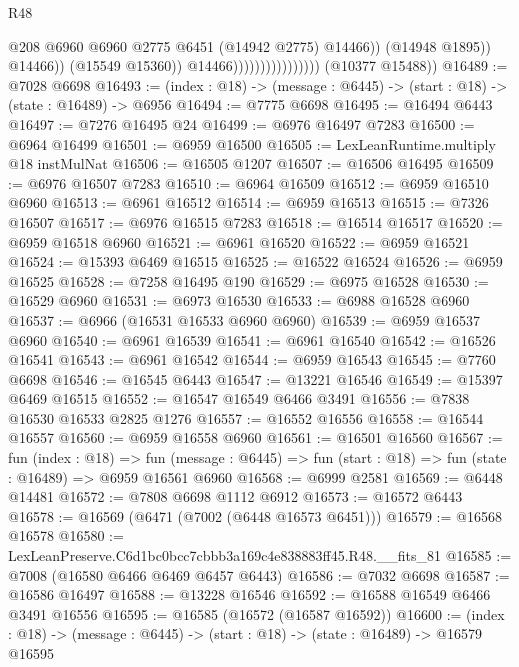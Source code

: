 \begin{lexlean}{R48}
\begin{coremodule}
                                                  @208
                                                  @6960
                                                  @6960
                                                  @2775
                                                  @6451
                                                  (@14942 @2775)
                                                  @14466))
                                              (@14948 @1895))
                                            @14466))
                                        (@15549 @15360))
                                      @14466))))))))))))))))
      (@10377 @15488))
@16489 := @7028 @6698
@16493 := (index : @18) -> (message : @6445) -> (start : @18) -> (state : @16489) -> @6956
@16494 := @7775 @6698
@16495 := @16494 @6443
@16497 := @7276 @16495 @24
@16499 := @6976 @16497 @7283
@16500 := @6964 @16499
@16501 := @6959 @16500
@16505 := LexLeanRuntime.multiply @18 instMulNat
@16506 := @16505 @1207
@16507 := @16506 @16495
@16509 := @6976 @16507 @7283
@16510 := @6964 @16509
@16512 := @6959 @16510 @6960
@16513 := @6961 @16512
@16514 := @6959 @16513
@16515 := @7326 @16507
@16517 := @6976 @16515 @7283
@16518 := @16514 @16517
@16520 := @6959 @16518 @6960
@16521 := @6961 @16520
@16522 := @6959 @16521
@16524 := @15393 @6469 @16515
@16525 := @16522 @16524
@16526 := @6959 @16525
@16528 := @7258 @16495 @190
@16529 := @6975 @16528
@16530 := @16529 @6960
@16531 := @6973 @16530
@16533 := @6988 @16528 @6960
@16537 := @6966 (@16531 @16533 @6960 @6960)
@16539 := @6959 @16537 @6960
@16540 := @6961 @16539
@16541 := @6961 @16540
@16542 := @16526 @16541
@16543 := @6961 @16542
@16544 := @6959 @16543
@16545 := @7760 @6698
@16546 := @16545 @6443
@16547 := @13221 @16546
@16549 := @15397 @6469 @16515
@16552 := @16547 @16549 @6466 @3491
@16556 := @7838 @16530 @16533 @2825 @1276
@16557 := @16552 @16556
@16558 := @16544 @16557
@16560 := @6959 @16558 @6960
@16561 := @16501 @16560
@16567 := fun (index : @18) =>
  fun (message : @6445) => fun (start : @18) => fun (state : @16489) => @6959 @16561 @6960
@16568 := @6999 @2581
@16569 := @6448 @14481
@16572 := @7808 @6698 @1112 @6912
@16573 := @16572 @6443
@16578 := @16569 (@6471 (@7002 (@6448 @16573 @6451)))
@16579 := @16568 @16578
@16580 := LexLeanPreserve.C6d1bc0bcc7cbbb3a169c4e838883ff45.R48.__fits_81
@16585 := @7008 (@16580 @6466 @6469 @6457 @6443)
@16586 := @7032 @6698
@16587 := @16586 @16497
@16588 := @13228 @16546
@16592 := @16588 @16549 @6466 @3491 @16556
@16595 := @16585 (@16572 (@16587 @16592))
@16600 := (index : @18) -> (message : @6445) -> (start : @18) -> (state : @16489) -> @16579 @16595

\end{coremodule}
\end{lexlean}
